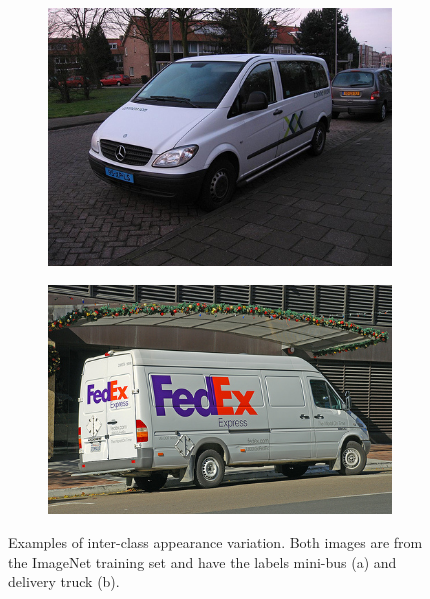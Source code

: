 \begin{figure}[H]
    \centering
    \begin{subfigure}[b]{0.45\textwidth}
        \center
        \includegraphics[width=\textwidth]{Figs/Problem/minibus.jpeg}
        \caption{}\label{fig:inter1a}
    \end{subfigure}
    \begin{subfigure}[b]{0.45\textwidth}
        \center
        \includegraphics[width=\textwidth]{Figs/Problem/deliverytruck.jpeg}
        \caption{}\label{fig:inter1b}
    \end{subfigure}
    \caption{Examples of inter-class appearance variation. Both images are from the ImageNet training set \cite{imagenet} and have the labels mini-bus (a) and delivery truck (b).}
    \label{fig:inter1}
\end{figure} 

